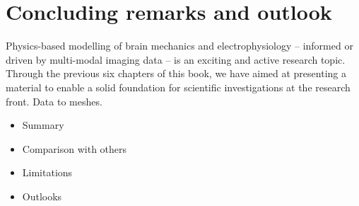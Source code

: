 \chapter{Concluding remarks and outlook}

Physics-based modelling of brain mechanics and electrophysiology --
informed or driven by multi-modal imaging data -- is an exciting and
active research topic. Through the previous six chapters of this book,
we have aimed at presenting a material to enable a solid foundation
for scientific investigations at the research front. Data to meshes.

\begin{itemize}
\item
  Summary
\item
  Comparison with others
\item
  Limitations
\item
  Outlooks
\end{itemize}
